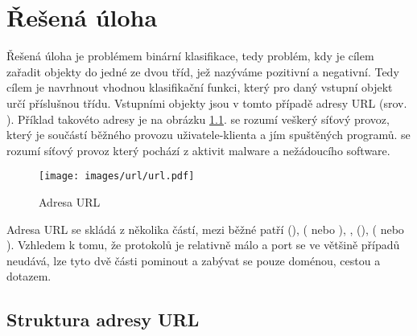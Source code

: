 \chapter{Řešená úloha}\label{problem}

Řešená úloha je problémem binární klasifikace, tedy problém, kdy je cílem zařadit objekty do jedné ze dvou tříd, jež nazýváme pozitivní a negativní. Tedy cílem je navrhnout vhodnou klasifikační funkci, který pro daný vstupní objekt určí příslušnou třídu. Vstupními objekty jsou v tomto případě adresy URL (srov. \cite{berners-lee_uniform_1994}). Příklad takovéto adresy je na obrázku \ref{url}.  se rozumí veškerý síťový provoz, který je součástí běžného provozu uživatele-klienta a jím spuštěných programů.  se rozumí síťový provoz který pochází z aktivit malware a nežádoucího software.

\begin{figure}[h]
	\caption{Adresa URL}\label{url}
	\centering
	\texttt{[image: images/url/url.pdf]}
\end{figure}

Adresa URL se skládá z několika částí, mezi běžné patří  (),  ( nebo ), ,  (),  ( nebo ). Vzhledem k tomu, že protokolů je relativně málo a port se ve většině případů neudává, lze tyto dvě části pominout a zabývat se pouze doménou, cestou a dotazem.

\section{Struktura adresy URL}\label{URL_structure}

